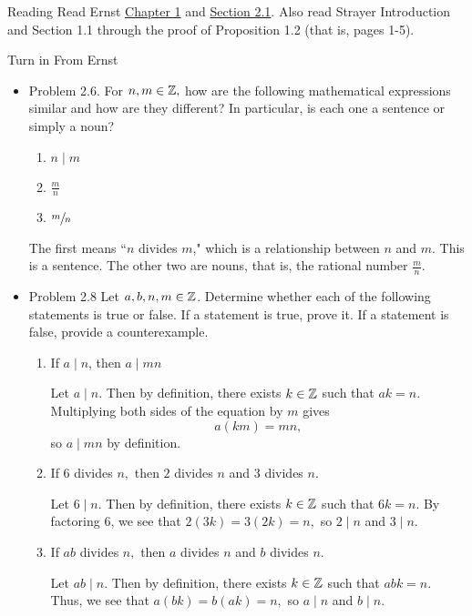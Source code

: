 \documentclass{ximera}
\begin{document}
  
\begin{pre}
\item[Reading]  Read Ernst  \href{https://danaernst.com/IBL-IntroToProof/pretext/chap_intro.html}{Chapter 1} and \href{https://danaernst.com/IBL-IntroToProof/pretext/sec_baby_number_theory.html}{Section 2.1}. Also read Strayer Introduction and Section 1.1 through the proof of Proposition 1.2 (that is, pages 1-5).

\item[Turn in] From Ernst
\begin{itemize}
 \item Problem 2.6. For $n,m\in\mathbb Z,$ how are the following mathematical expressions similar and how are they different? In particular, is each one a sentence or simply a noun?
 
\begin{enumerate}%
\item  $n\mid m$
\item $\frac{m}{n}$ 
\item $\sfrac{m}{n}$ 
\end{enumerate}

\begin{solution}
 The first means ``$n$ divides $m$," which is a relationship between $n$ and $m$. This is a sentence. The other two are nouns, that is, the rational number $\frac{m}{n}$.
\end{solution}

\item Problem 2.8 Let $a,b,n,m\in\mathbb Z$.
 Determine whether each of the following statements is true or false. If a statement is true, prove it. If a statement is false, provide a counterexample.
 \begin{enumerate}%
\item  If $a\mid n$, then $a\mid mn$
\begin{solution}
 Let $a\mid n$. Then by definition, there exists $k\in\mathbb Z$ such that $ak=n$. Multiplying both sides of the equation by $m$ gives \[a(km)=mn,\] so $a\mid mn$ by definition.
\end{solution}
\item If $6$ divides $n,$ then $2$ divides $n$ and $3$ divides $n$.
\begin{solution}
  Let $6\mid n$. Then by definition, there exists $k\in\mathbb Z$ such that $6k=n$. By factoring $6$, we see that $2(3k)=3(2k)=n,$ so $2\mid n$ and $3\mid n$. 
  \end{solution}
\item If $ab$ divides $n,$ then $a$ divides $n$ and $b$ divides $n$.
\begin{solution}
  Let $ab\mid n$. Then by definition, there exists $k\in\mathbb Z$ such that $abk=n$. Thus, we see that $a(bk)=b(ak)=n,$ so $a\mid n$ and $b\mid n$. 
  \end{solution}
\end{enumerate}


\end{itemize}
\end{pre}
\end{document}
